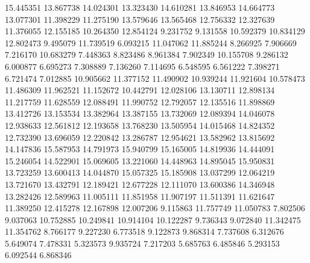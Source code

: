 15.445351
13.867738
14.024301
13.323430
14.610281
13.846953
14.664773
13.077301
11.398229
11.275190
13.579646
13.565468
12.756332
12.327639
11.376055
12.155185
10.264350
12.854124
9.231752
9.131558
10.592379
10.834129
12.802473
9.495079
11.739519
6.093215
11.047062
11.885244
8.266925
7.906669
7.216170
10.683279
7.448363
8.823486
8.961384
7.902349
10.155708
9.286132
6.000877
6.695273
7.308889
7.136260
7.114695
6.548595
6.561222
7.398271
6.721474
7.012885
10.905662
11.377152
11.490902
10.939244
11.921604
10.578473
11.486309
11.962521
11.152672
10.442791
12.028106
13.130711
12.898134
11.217759
11.628559
12.088491
11.990752
12.792057
12.135516
11.898869
13.412726
13.153534
13.382964
13.387155
13.732069
12.089394
14.046078
12.938633
12.561812
12.193658
13.768230
13.505954
14.015468
14.824352
12.732390
13.696059
12.220842
13.286787
12.954621
13.582962
13.815692
14.147836
15.587953
14.791973
15.940799
15.165005
14.819936
14.444091
15.246054
14.522901
15.069605
13.221060
14.448963
14.895045
15.950831
13.723259
13.600413
14.044870
15.057325
15.185908
13.037299
12.064219
13.721670
13.432791
12.189421
12.677228
12.111070
13.600386
14.346948
13.282426
12.589963
11.005111
11.851958
11.907197
11.511391
11.621647
11.389250
12.415278
12.167898
12.007206
9.115863
11.757749
11.050783
7.802506
9.037063
10.752885
10.249841
10.914104
10.122287
9.736343
9.072840
11.342475
11.354762
8.766177
9.227230
6.773518
9.122873
9.868314
7.737608
6.312676
5.649074
7.478331
5.323573
9.935724
7.217203
5.685763
6.485846
5.293153
6.092544
6.868346
